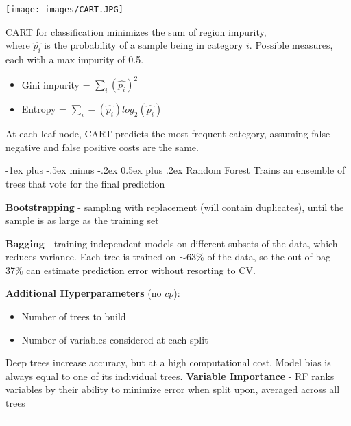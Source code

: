 \documentclass[10pt,landscape]{article}
\makeatletter
\renewcommand{\subsection}{\@startsection{subsection}{2}{0mm}%
                                {-1ex plus -.5ex minus -.2ex}%
                                {0.5ex plus .2ex}%
                                {\normalfont\normalsize\bfseries}}
\makeatother
\begin{document}
\begin{multicols}{3}
\begin{center}
\vspace{-1mm}
    \texttt{[image: images/CART.JPG]}
\end{center}
\vspace{-2mm}
CART for classification minimizes the sum of region impurity, \\
where $\hat{p_i}$ is the probability of a sample being in category $i$.
Possible measures, each with a max impurity of 0.5.
\begin{itemize}[label={--},leftmargin=4mm]
\vspace{-1mm}
\itemsep -.4mm 
\item Gini impurity = $\sum_i (\hat{p_i})^2$ 
\item Entropy = $\sum_i -(\hat{p_i}) log_2(\hat{p_i})$ 
\end{itemize}
At each leaf node, CART predicts the most frequent category, assuming false negative and false positive costs are the same.

\subsection{Random Forest}
Trains an ensemble of trees that vote for the final prediction

\textbf{Bootstrapping} - sampling with replacement (will contain duplicates), until the sample is as large as the training set

\textbf{Bagging} - training independent models on different subsets of the data, which reduces variance. Each tree is trained on $\sim$63\% of the data, so the out-of-bag 37\% can estimate prediction error without resorting to CV.  

\textbf{Additional Hyperparameters} (no $cp$):
\begin{itemize}[label={--},leftmargin=4mm]
\vspace{-1mm}
\itemsep -.4mm 
\item Number of trees to build
\item Number of variables considered at each split
\end{itemize}
Deep trees increase accuracy, but at a high computational cost. Model bias is always equal to one of its individual trees.
\textbf{Variable Importance} - RF ranks variables by their ability to minimize error when split upon, averaged across all trees 
\columnbreak
\\\textcolor{white}{.}\vspace{-5mm}\\ %

\end{multicols}
\end{document}
